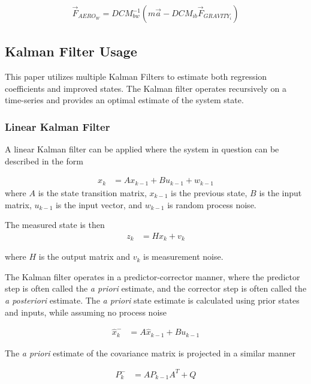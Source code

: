 \documentclass[]{aiaa-tc}%
\begin{document}
\begin{align}
\vec{F}_{AERO_W} = DCM_{bw}^{-1}(m\vec{a} - DCM_{ib}\vec{F}_{GRAVITY_i})
\end{align}


\subsection*{Kalman Filter Usage}
\label{kalman-filter}
This paper utilizes multiple Kalman Filters to estimate both regression coefficients and improved states. The Kalman filter operates recursively on a time-series and provides an optimal estimate of the system state.

\subsubsection*{Linear Kalman Filter}
A linear Kalman filter can be applied where the system in question can be described in the form \cite{welch1995introduction}

\begin{align}
x_k &= Ax_{k-1} + Bu_{k-1}+w_{k-1}
\end{align}
where $A$ is the state transition matrix, $x_{k-1}$ is the previous state, $B$ is the input matrix, $u_{k-1}$ is the input vector, and $w_{k-1}$ is random process noise.

The measured state is then 
\begin{align}
z_k &= Hx_k+v_k
\end{align} 

where $H$ is the output matrix and $v_k$ is measurement noise.

\indent
The Kalman filter operates in a predictor-corrector manner, where the predictor step is often called the \textit{a priori} estimate, and the corrector step is often called the \textit{a posteriori} estimate. The \textit{a priori} state estimate is calculated using prior states and inputs, while assuming no process noise

\begin{align}
\hat{x}^-_k &= A\hat{x}_{k-1}+Bu_{k-1}
\end{align}



The \textit{a priori} estimate of the covariance matrix is projected in a similar manner

\begin{align}
P^-_k &= AP_{k-1}A^T+Q
\end{align}
\end{document}
